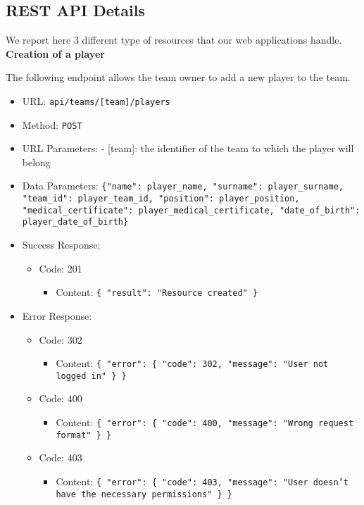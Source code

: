 \subsection{REST API Details}

We report here 3 different type of resources that our web applications handle.\\
\textbf{Creation of a player}

The following endpoint allows the team owner to add a new player to the team.
\begin{itemize}
    \item URL: \texttt{api/teams/[team]/players}
    \item Method: \texttt{POST}
    \item URL Parameters: - [team]: the identifier of the team to which the player will belong
    \item Data Parameters: \texttt{\{"name": player\_name, "surname": player\_surname, "team\_id": player\_team\_id, "position": player\_position, "medical\_certificate": player\_medical\_certificate, "date\_of\_birth": player\_date\_of\_birth\}}
    \item Success Response: 
    \begin{itemize}
        \item Code: 201 
            \begin{itemize}
                \item Content: \texttt{\{ "result": "Resource created" \}}
            \end{itemize}
    \end{itemize}
    \newpage
    \item Error Response:
    \begin{itemize}
        \item Code: 302
            \begin{itemize}
                \item Content: \texttt{\{ "error": \{ "code": 302, "message": "User not logged in" \} \}}
            \end{itemize}
        
        \item Code: 400
            \begin{itemize}
                \item Content: \texttt{\{ "error": \{ "code": 400, "message": "Wrong request format" \} \}}
            \end{itemize}
        
        \item Code: 403
            \begin{itemize}
                \item Content: \texttt{\{ "error": \{ "code": 403, "message": "User doesn't have the necessary permissions" \} \}}
            \end{itemize}
        

\end{itemize}
\end{itemize}
